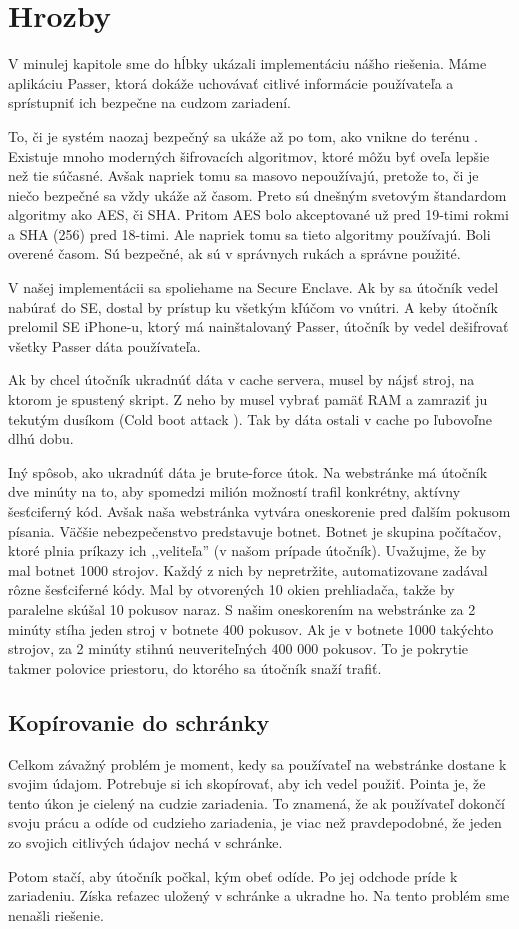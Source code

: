 \section{Hrozby}
\label{hrozby}
V minulej kapitole sme do hĺbky ukázali implementáciu nášho riešenia. Máme aplikáciu Passer, ktorá dokáže uchovávať citlivé informácie používateľa a sprístupniť ich bezpečne na cudzom zariadení. 

To, či je systém naozaj bezpečný sa ukáže až po tom, ako vnikne do terénu \cite{practicalcryptography}. Existuje mnoho moderných šifrovacích algoritmov, ktoré môžu byť oveľa lepšie než tie súčasné. Avšak napriek tomu sa masovo nepoužívajú, pretože to, či je niečo bezpečné sa vždy ukáže až časom. Preto sú dnešným svetovým štandardom algoritmy ako AES, či SHA. Pritom AES bolo akceptované už pred 19-timi rokmi a SHA (256) pred 18-timi. Ale napriek tomu sa tieto algoritmy používajú. Boli overené časom. Sú bezpečné, ak sú v správnych rukách a správne použité.

V našej implementácii sa spoliehame na Secure Enclave. Ak by sa útočník vedel nabúrať do SE, dostal by prístup ku všetkým kľúčom vo vnútri. A keby útočník prelomil SE iPhone-u, ktorý má nainštalovaný Passer, útočník by vedel dešifrovať všetky Passer dáta používateľa.

Ak by chcel útočník ukradnúť dáta v cache servera, musel by nájsť stroj, na ktorom je spustený skript. Z neho by musel vybrať pamäť RAM a zamraziť ju tekutým dusíkom (Cold boot attack \cite{coldboot}). Tak by dáta ostali v cache po ľubovoľne dlhú dobu. 

Iný spôsob, ako ukradnúť dáta je brute-force útok. Na webstránke má útočník dve minúty na to, aby spomedzi milión možností trafil konkrétny, aktívny šesťciferný kód. Avšak naša webstránka vytvára oneskorenie pred ďalším pokusom písania. Väčšie nebezpečenstvo predstavuje botnet. Botnet je skupina počítačov, ktoré plnia príkazy ich ,,veliteľa'' (v našom prípade útočník). Uvažujme, že by mal botnet 1000 strojov. Každý z nich by nepretržite, automatizovane zadával rôzne šesťciferné kódy. Mal by otvorených 10 okien prehliadača, takže by paralelne skúšal 10 pokusov naraz. S našim oneskorením na webstránke za 2 minúty stíha jeden stroj v botnete 400 pokusov. Ak je v botnete 1000 takýchto strojov, za 2 minúty stihnú neuveriteľných 400 000 pokusov. To je pokrytie takmer polovice priestoru, do ktorého sa útočník snaží trafiť. 

\subsection{Kopírovanie do schránky}
Celkom závažný problém je moment, kedy sa používateľ na webstránke dostane k svojim údajom. Potrebuje si ich skopírovať, aby ich vedel použiť. Pointa je, že tento úkon je cielený na cudzie zariadenia. To znamená, že ak používateľ dokončí svoju prácu a odíde od cudzieho zariadenia, je viac než pravdepodobné, že jeden zo svojich citlivých údajov nechá v schránke. 

Potom stačí, aby útočník počkal, kým obeť odíde. Po jej odchode príde k zariadeniu. Získa reťazec uložený v schránke a ukradne ho. Na tento problém sme nenašli riešenie.


